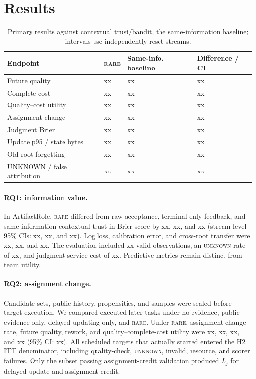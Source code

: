 \documentclass[sigconf,anonymous]{aamas}
\newcommand{\rare}{\textsc{rare}}
\newcommand{\unknown}{\textsc{unknown}}
\begin{document}
\section{Results}
\begin{table}[t]
\centering\small
\setlength{\tabcolsep}{2.2pt}
\begin{tabular}{p{}p{}p{}p{}}
\toprule
Endpoint & \rare{} & Same-info. baseline & Difference / CI \\
\midrule
Future quality & xx & xx & xx \\
Complete cost & xx & xx & xx \\
Quality--cost utility & xx & xx & xx \\
Assignment change & xx & xx & xx \\
Judgment Brier & xx & xx & xx \\
Update p95 / state bytes & xx & xx & xx \\
Old-root forgetting & xx & xx & xx \\
UNKNOWN / false attribution & xx & xx & xx \\
\bottomrule
\end{tabular}
\caption{Primary results against contextual trust/bandit, the same-information baseline; intervals use independently reset streams.}
\label{tab:results}
\end{table}

\paragraph{RQ1: information value.} In ArtifactRole, \rare{} differed from raw acceptance, terminal-only feedback, and same-information contextual trust in Brier score by xx, xx, and xx (stream-level 95\% CIs: xx, xx, and xx). Log loss, calibration error, and cross-root transfer were xx, xx, and xx. The evaluation included xx valid observations, an \unknown{} rate of xx, and judgment-service cost of xx. Predictive metrics remain distinct from team utility.

\paragraph{RQ2: assignment change.} Candidate sets, public history, propensities, and samples were sealed before target execution. We compared executed later tasks under no evidence, public evidence only, delayed updating only, and \rare{}. Under \rare{}, assignment-change rate, future quality, rework, and quality--complete-cost utility were xx, xx, xx, and xx (95\% CI: xx). All scheduled targets that actually started entered the H2 ITT denominator, including quality-check, \unknown{}, invalid, resource, and scorer failures. Only the subset passing assignment-credit validation produced $L_j$ for delayed update and assignment credit.
\end{document}
